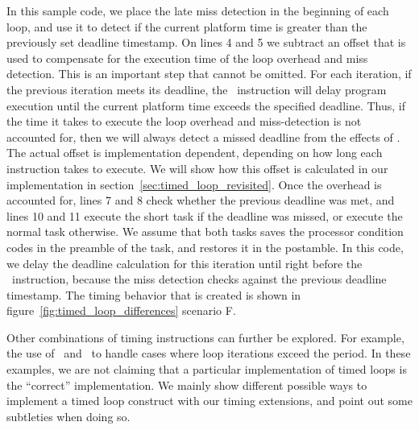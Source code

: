 In this sample code, we place the late miss detection in the beginning of each loop, and use it to detect if the current platform time is greater than the previously set deadline timestamp.
On lines 4 and 5 we subtract an offset that is used to compensate for the execution time of the loop overhead and miss detection. 
This is an important step that cannot be omitted.
For each iteration, if the previous iteration meets its deadline, the \delayuntil\ instruction will delay program execution until the current platform time exceeds the specified deadline. 
Thus, if the time it takes to execute the loop overhead and miss-detection is not accounted for, then we will always detect a missed deadline from the effects of \delayuntil.  
The actual offset is implementation dependent, depending on how long each instruction takes to execute.
We will show how this offset is calculated in our implementation in section~\ref{sec:timed_loop_revisited}.
Once the overhead is accounted for, lines 7 and 8 check whether the previous deadline was met, and lines 10 and 11 execute the short task if the deadline was missed, or execute the normal task otherwise.
We assume that both tasks saves the processor condition codes in the preamble of the task, and restores it in the postamble. 
In this code, we delay the deadline calculation for this iteration until right before the \delayuntil\ instruction, because the miss detection checks against the previous deadline timestamp.      
The timing behavior that is created is shown in figure~\ref{fig:timed_loop_differences} scenario F. 

Other combinations of timing instructions can further be explored.
For example, the use of \exceptiononexpire\ and \deactivateexception\ to handle cases where loop iterations exceed the period.
In these examples, we are not claiming that a particular implementation of timed loops is the ``correct'' implementation.
We mainly show different possible ways to implement a timed loop construct with our timing extensions, and point out some subtleties when doing so.



